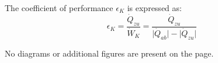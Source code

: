 The coefficient of performance \( \epsilon_K \) is expressed as:  
\[
\epsilon_K = \frac{\dot{Q}_{zu}}{\dot{W}_K} = \frac{\dot{Q}_{zu}}{\lvert \dot{Q}_{ab} \rvert - \lvert \dot{Q}_{zu} \rvert}
\]  

No diagrams or additional figures are present on the page.